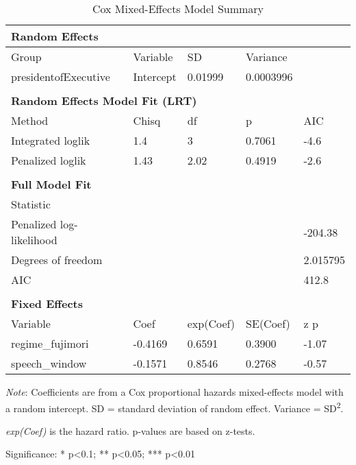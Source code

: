 \begin{table}[ht]
\centering
\begin{threeparttable}
\caption{Cox Mixed-Effects Model Summary}
\label{tab:coxme_auto}
\begin{tabular}{lllll}
\toprule
\multicolumn{5}{l}{\textbf{Random Effects}} \\
\midrule
Group & Variable & SD & Variance & \\
presidentofExecutive & Intercept &  0.01999  &  0.0003996  & \\
\\
\multicolumn{5}{l}{\textbf{Random Effects Model Fit (LRT)}} \\
\midrule
Method & Chisq & df & p & AIC \\
Integrated loglik &  1.4  &  3  &  0.7061  &  -4.6  \\
Penalized loglik &  1.43  &  2.02  &  0.4919  &  -2.6  \\
\\
\multicolumn{5}{l}{\textbf{Full Model Fit}} \\
\midrule
Statistic & & & & \\
Penalized log-likelihood & & & &  -204.38  \\
Degrees of freedom & & & &  2.015795  \\
AIC & & & &  412.8  \\
\\
\multicolumn{5}{l}{\textbf{Fixed Effects}} \\
\midrule
Variable & Coef & exp(Coef) & SE(Coef) & z \quad p \\
 regime\_fujimori & -0.4169 & 0.6591 & 0.3900 & -1.07 \quad 0.285 \\
speech\_window & -0.1571 & 0.8546 & 0.2768 & -0.57 \quad 0.569 \\ 
\bottomrule
\end{tabular}
\begin{tablenotes}
\footnotesize
\item \textit{Note}: Coefficients are from a Cox proportional hazards mixed-effects model with a random intercept. SD = standard deviation of random effect. Variance = SD\textsuperscript{2}.
\item \textit{exp(Coef)} is the hazard ratio. p-values are based on z-tests.
\item Significance: * p<0.1; ** p<0.05; *** p<0.01
\end{tablenotes}
\end{threeparttable}
\end{table}
